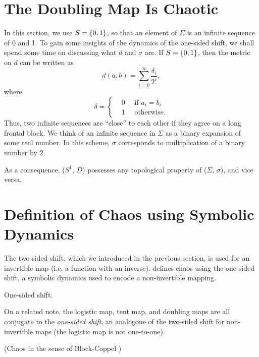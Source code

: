 \documentclass[12pt,twoside]{book}
\begin{document}
\section{The Doubling Map Is Chaotic}
In this section, we use $S = \left \{ 0,1 \right \}$, so that an element of $\Sigma$ is an infinite sequence of 0 and 1.
To gain some insights of the dynamics of the one-sided shift, we shall spend some time on discussing what $d$ and $\sigma$ are.
If $S = \left \{ 0,1 \right \}$, then the metric on $d$ can be written as
\begin{equation*}
  d(a,b) = \sum\limits_{i = 0}^{\infty} \frac{\delta_{i}}{2^i},
\end{equation*}
where
\begin{equation*}
  \delta = 
  \begin{cases}
    &0 \quad \mbox{ if } a_i = b_i  \\
    &1 \quad \mbox{ otherwise.}
  \end{cases}
\end{equation*}
Thus, two infinite sequences are ``close'' to each other if they agree on a long frontal block.
We think of an infinite sequence in $\Sigma$ as a binary expansion of some real number.
In this scheme, $\sigma$ corresponds to multiplication of a binary number by $2$.

As a consequence, ($S^1 $, $D$) possesses any topological property of ($\Sigma$, $\sigma$), and vice versa.


\section{Definition of Chaos using Symbolic Dynamics}
The two-sided shift, which we introduced in the previous section, is used for an invertible map (i.e. a function with an inverse).
\citet{blockcoppel} defines chaos using the one-sided shift, a symbolic dynamics used to encode a non-invertible mapping.
\begin{definition}
  One-sided shift.
\end{definition}
On a related note, the logistic map, tent map, and doubling maps are all conjugate to the \textit{one-sided shift}, an analogoue of the two-sided shift for non-invertible maps (the logistic map is not one-to-one).
\begin{definition}
  (Chaos in the sense of Block-Coppel \citep{blockcoppel})
  \label{defn:blockcoppel}
\end{definition}





\printindex
\end{document}
